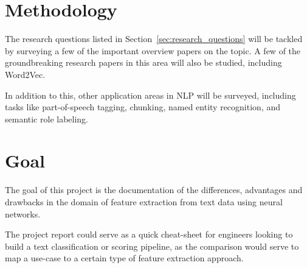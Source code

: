 \documentclass[parskip=half]{scrartcl}
\begin{document}

\section{Methodology} %
\label{sec:methodology}

    The research questions listed in Section~\ref{sec:research_questions} will be tackled by surveying a few of the important overview papers on the topic\cite{goldberg2016primer}\cite{bengio2003neural}\cite{morin2005hierarchical}. A few of the groundbreaking research papers in this area will also be studied, including Word2Vec\cite{mikolov2013efficient}\cite{mikolov2013distributed}\cite{mikolov2013linguistic}.

    In addition to this, other application areas in NLP will be surveyed, including tasks like part-of-speech tagging, chunking, named entity recognition, and semantic role labeling. \cite{socher2011parsing}\cite{luong2013better}\cite{maas2015lexicon}\cite{li2015hierarchical}\cite{collobert2011natural}



\section{Goal} %
\label{sec:goal}

    The goal of this project is the documentation of the differences, advantages and drawbacks in the domain of feature extraction from text data using neural networks. 

    The project report could serve as a quick cheat-sheet for engineers looking to build a text classification or scoring pipeline, as the comparison would serve to map a use-case to a certain type of feature extraction approach.





\end{document}
